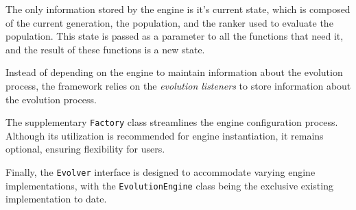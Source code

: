  The only information stored by the engine is it's current state, which is
  composed of the current generation, the population, and the ranker used to
  evaluate the population.
  This state is passed as a parameter to all the functions that need it, and
  the result of these functions is a new state.

  Instead of depending on the engine to maintain information about the evolution
  process, the framework relies on the \emph{evolution listeners} to store
  information about the evolution process.

  The supplementary \texttt{Factory} class streamlines the engine configuration 
  process.
  Although its utilization is recommended for engine instantiation, it remains 
  optional, ensuring flexibility for users.

  Finally, the \texttt{Evolver} interface is designed to accommodate varying 
  engine implementations, with the \texttt{EvolutionEngine} class being the 
  exclusive existing implementation to date.

  
